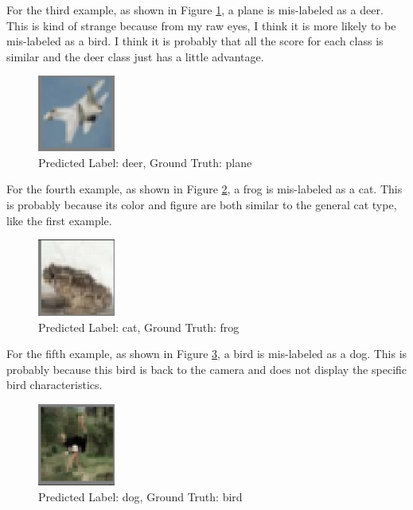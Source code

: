 \documentclass[twoside,12pt]{homework}
\begin{document}
\noindent For the third example, as shown in Figure \ref{fig14}, a plane is mis-labeled as a deer. This is kind of strange because from my raw eyes, I think it is more likely to be mis-labeled as a bird. I think it is probably that all the score for each class is similar and the deer class just has a little advantage.\\

\begin{figure}[!htb]
\begin{center}
\includegraphics[width=1in]{13.png}
\caption{Predicted Label: deer, Ground Truth: plane}
\label{fig14}
\end{center}
\end{figure}

\noindent For the fourth example, as shown in Figure \ref{fig15}, a frog is mis-labeled as a cat. This is probably because its color and figure are both similar to the general cat type, like the first example.\\

\begin{figure}[!htb]
\begin{center}
\includegraphics[width=1in]{14.png}
\caption{Predicted Label: cat, Ground Truth: frog}
\label{fig15}
\end{center}
\end{figure}

\noindent For the fifth example, as shown in Figure \ref{fig16}, a bird is mis-labeled as a dog. This is probably because this bird is back to the camera and does not display the specific bird characteristics.

\begin{figure}[!htb]
\begin{center}
\includegraphics[width=1in]{15.png}
\caption{Predicted Label: dog, Ground Truth: bird}
\label{fig16}
\end{center}
\end{figure}
\end{document}
